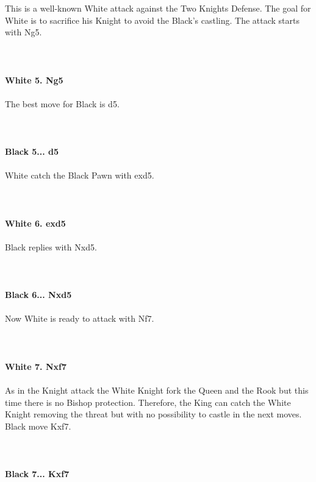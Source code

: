 \documentclass{article}
\begin{document}
This is a well-known White attack against the Two Knights Defense. The goal for White is to sacrifice his Knight to avoid the Black's castling. The attack starts with Ng5.\\
\\

\\
\\
\textbf{White 5. Ng5}\\
\\
The best move for Black is d5.\\
\\

\\
\\
\textbf{Black 5... d5}\\
\\
White catch the Black Pawn with exd5.\\
\\

\\
\\
\textbf{White 6. exd5}\\
\\
Black replies with Nxd5.\\
\\

\\
\\
\textbf{Black 6... Nxd5}\\
\\
Now White is ready to attack with Nf7.\\
\\

\\
\\
\textbf{White 7. Nxf7}\\
\\
As in the Knight attack the White Knight fork the Queen and the Rook but this time there is no Bishop protection. Therefore, the King can catch the White Knight removing the threat but with no possibility to castle in the next moves. Black move Kxf7.\\
\\

\\
\\
\textbf{Black 7... Kxf7}\\
\\
\\
\\
\end{document}
